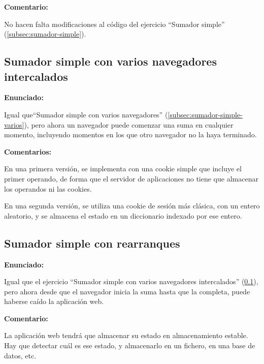 \textbf{Comentario:}

No hacen falta modificaciones al código del ejercicio ``Sumador simple'' (\ref{subsec:sumador-simple}).


\subsection{Sumador simple con varios navegadores intercalados}
\label{subsec:sumador-simple-varios-intercalados}

\textbf{Enunciado:}

Igual que``Sumador simple con varios navegadores'' (\ref{subsec:sumador-simple-varios}), pero ahora un navegador puede comenzar una suma en cualquier momento, incluyendo momentos en los que otro navegador no la haya terminado.

\textbf{Comentarios:}

En una primera versión, se implementa con una cookie simple que incluye el primer operando, de forma que el servidor de aplicaciones no tiene que almacenar los operandos ni las cookies.

En una segunda versión, se utiliza una cookie de sesión más clásica, con un entero aleatorio, y se almacena el estado en un diccionario indexado por ese entero.

\subsection{Sumador simple con rearranques}
\label{subsec:sumador-simple-rearranques}

\textbf{Enunciado:}

Igual que el ejercicio ``Sumador simple con varios navegadores intercalados'' (\ref{subsec:sumador-simple-varios-intercalados}), pero ahora desde que el navegador inicia la suma hasta que la completa, puede haberse caído la aplicación web.

\textbf{Comentario:}

La aplicación web tendrá que  almacenar su estado en almacenamiento estable. Hay que detectar cuál es ese estado, y almacenarlo en  un fichero, en  una base de datos, etc.


